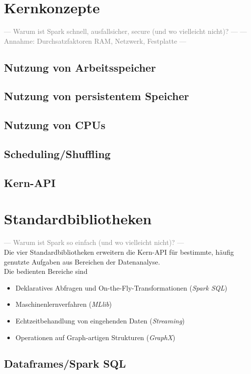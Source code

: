 \section{Kernkonzepte}
\textcolor{gray}{--- Warum ist Spark schnell, ausfallsicher, secure (und wo vielleicht nicht)? ---}
\textcolor{gray}{--- Annahme: Durchsatzfaktoren RAM, Netzwerk, Festplatte ---}
\subsection{Nutzung von Arbeitsspeicher}
\subsection{Nutzung von persistentem Speicher}
\subsection{Nutzung von CPUs}
\subsection{Scheduling/Shuffling}
\subsection{Kern-API}

\section{Standardbibliotheken}
\textcolor{gray}{--- Warum ist Spark so einfach (und wo vielleicht nicht)? ---}\\
Die vier Standardbibliotheken erweitern die Kern-API für bestimmte, häufig genutzte Aufgaben aus Bereichen der Datenanalyse.\\

Die bedienten Bereiche sind
\begin{itemize}
	\item Deklaratives Abfragen und On-the-Fly-Transformationen (\textit{Spark SQL})
	\item Maschinenlernverfahren (\textit{MLlib})
	\item Echtzeitbehandlung von eingehenden Daten (\textit{Streaming})
	\item Operationen auf Graph-artigen Strukturen (\textit{GraphX})
\end{itemize}

\subsection{Dataframes/Spark SQL}
